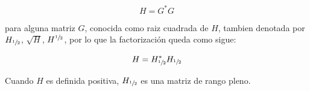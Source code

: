 \begin{teorema}
\begin{nota}
\begin{enumerate}
                    \begin{equation*}
                        H = G^* G
                    \end{equation*}

                    para alguna matriz $G$, conocida como raiz cuadrada de $H$, tambien denotada por $H_{\sfrac{1}{2}}$, $\sqrt{H}$, $H^{\sfrac{1}{2}}$, por lo que la factorización queda como sigue:

                    \begin{equation*}
                        H = H_{\sfrac{1}{2}}^* H_{\sfrac{1}{2}}
                    \end{equation*}

                    Cuando $H$ es definida positiva, $H_{\sfrac{1}{2}}$ es una matriz de rango pleno.
                \end{enumerate}
            \end{nota}
        \end{teorema}

